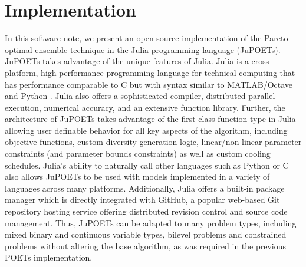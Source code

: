 \documentclass{bmcart}
\begin{document}

\section*{Implementation}
In this software note, we present an open-source implementation of the Pareto optimal ensemble technique in the Julia programming language (JuPOETs).
JuPOETs takes advantage of the unique features of Julia.
Julia is a cross-platform, high-performance programming language for technical computing that has performance comparable to C but with syntax similar to MATLAB/Octave and Python \cite{Julia}.
Julia also offers a sophisticated compiler, distributed parallel execution, numerical accuracy, and an extensive function library.
Further, the architecture of JuPOETs takes advantage of the first-class function type in Julia allowing user definable behavior for all key aspects of the algorithm, including objective functions, custom diversity generation logic, linear/non-linear parameter constraints (and parameter bounds constraints) as well as custom cooling schedules.
Julia's ability to naturally call other languages such as Python or C also allows JuPOETs to be used with models implemented in a variety of languages across many platforms.
Additionally, Julia offers a built-in package manager which is directly integrated with GitHub,
a popular web-based Git repository hosting service offering distributed revision control and source code management.
Thus, JuPOETs can be adapted to many problem types, including mixed binary and continuous variable types, bilevel problems and constrained problems without altering the base algorithm, as was required in the previous POETs implementation.
\end{document}
